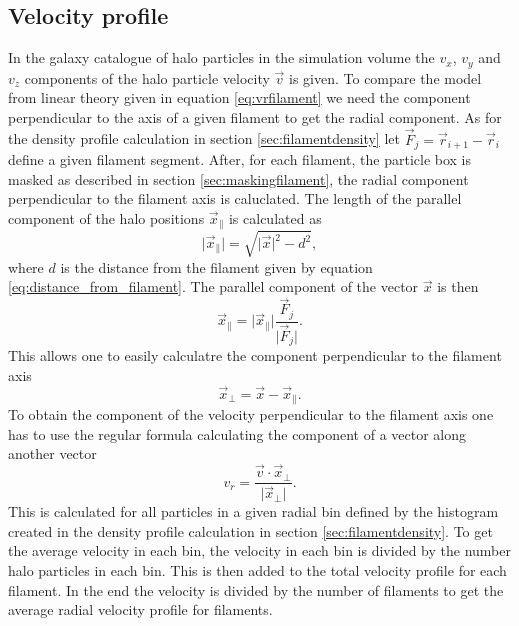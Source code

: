\subsection{Velocity profile}
In the galaxy catalogue of halo particles in the simulation volume the $v_x$,
$v_y$ and $v_z$ components of the halo particle velocity $\vec{v}$ is given. To
compare the model from linear theory given in equation \ref{eq:vrfilament} we
need the component perpendicular to the axis of a given filament to get the
radial component. As for the density profile calculation in section
\ref{sec:filamentdensity} let $\vec{F}_j=\vec{r}_{i+1} - \vec{r}_i$ define a given
filament segment. After, for each filament, the particle box is masked as
described in section \ref{sec:maskingfilament}, the radial component
perpendicular to the filament axis is caluclated. The length of the parallel component of the
halo positions $\vec{x}_\parallel$ is calculated as
\begin{equation}
    \vert\vec{x}_\parallel\vert=\sqrt{\vert \vec{x}\vert^2-d^2},
\end{equation}
where $d$ is the distance from the filament given by equation
\ref{eq:distance_from_filament}. The parallel component of the vector $\vec{x}$
is then
\begin{equation}
    \vec{x}_\parallel=\vert\vec{x}_\parallel\vert\frac{\vec{F}_j}{\vert\vec{F}_j\vert}.
\end{equation}
This allows one to easily calculatre the component perpendicular to the filament
axis 
\begin{equation}
    \vec{x}_\perp=\vec{x}-\vec{x}_\parallel.
\end{equation}
To obtain the component of the velocity perpendicular to the filament axis one
has to use the regular formula calculating the component of a vector along
another vector
\begin{equation}
    v_r=\frac{\vec{v}\cdot\vec{x}_\perp}{\vert\vec{x}_\perp\vert}.
\end{equation}
This is calculated for all particles in a given radial bin defined by the
histogram created in the density profile calculation in section
\ref{sec:filamentdensity}. To get the average velocity in each bin, the velocity
in each bin is divided by the number halo particles in each bin. This is then
added to the total velocity profile for each filament. In the end the
velocity is divided by the number of filaments to get the average radial
velocity profile for filaments.
